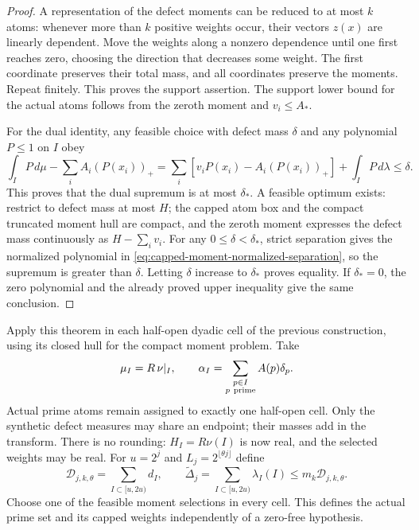 \documentclass[11pt]{article}
\theoremstyle{definition}
\begin{document}
\begin{proof}
A representation of the defect moments can be reduced to at most
$k$ atoms: whenever more than $k$ positive weights occur, their
vectors $z(x)$ are linearly dependent. Move the weights along a
nonzero dependence until one first reaches zero, choosing the
direction that decreases some weight. The first coordinate
preserves their total mass, and all coordinates preserve the
moments. Repeat finitely. This proves the support assertion.
The support lower bound for the actual atoms follows from the
zeroth moment and $v_i\le A_*$.

For the dual identity, any feasible choice with defect mass
$\delta$ and any polynomial $P\le1$ on $I$ obey
\[
 \int_I P\,d\mu-\sum_i A_i(P(x_i))_+
 =\sum_i[v_iP(x_i)-A_i(P(x_i))_+]+\int_I P\,d\lambda
 \le\delta.
\]
This proves that the dual supremum is at most $\delta_*$.
A feasible optimum exists: restrict to defect mass at most $H$;
the capped atom box and the compact truncated moment hull are
compact, and the zeroth moment expresses the defect mass
continuously as $H-\sum_i v_i$.
For any $0\le\delta<\delta_*$, strict separation gives the
normalized polynomial in
\eqref{eq:capped-moment-normalized-separation}, so the supremum
is greater than $\delta$. Letting $\delta$ increase to $\delta_*$
proves equality. If $\delta_*=0$, the zero polynomial and the
already proved upper inequality give the same conclusion.
\end{proof}

Apply this theorem in each half-open dyadic cell of the previous
construction, using its closed hull for the compact moment
problem. Take
\[
 \mu_I=R\,\nu|_I,\qquad
 \alpha_I=\sum_{\substack{p\in I\\p\ {\rm prime}}}A(p)\delta_p .
\]
Actual prime atoms remain assigned to exactly one half-open cell.
Only the synthetic defect measures may share an endpoint; their
masses add in the transform. There is no rounding:
$H_I=R\nu(I)$ is now real, and the selected weights may be real.
For $u=2^j$ and $L_j=2^{\lfloor\theta j\rfloor}$ define
\begin{equation}
 \mathcal D_{j,k,\theta}
       =\sum_{I\subset[u,2u)} d_I,\qquad
 \widetilde\Delta_j
       =\sum_{I\subset[u,2u)}\lambda_I(I)
       \le m_k\mathcal D_{j,k,\theta}.
 \label{eq:moment-total-defect}
\end{equation}
Choose one of the feasible moment selections in every cell.
This defines the actual prime set and its capped weights
independently of a zero-free hypothesis.
\end{document}
